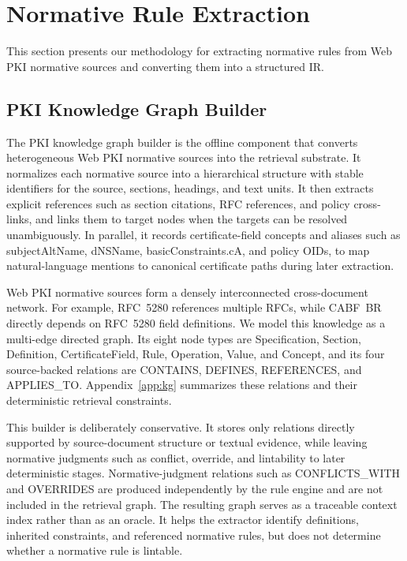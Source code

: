 \section{Normative Rule Extraction}
\label{sec:rule-extraction}

This section presents our methodology for extracting normative rules from Web
PKI normative sources and converting them into a structured IR.

\subsection{PKI Knowledge Graph Builder}
\label{sec:method-kg-builder}

The PKI knowledge graph builder is the offline component that converts heterogeneous Web PKI normative sources into the retrieval substrate.
It normalizes each normative source into a hierarchical structure with stable identifiers for the source, sections, headings, and text units.
It then extracts explicit references such as section citations, RFC references, and policy cross-links, and links them to target nodes when the targets can be resolved unambiguously.
In parallel, it records certificate-field concepts and aliases such as subjectAltName, dNSName, basicConstraints.cA, and policy OIDs, to map natural-language mentions to canonical certificate paths during later extraction.

Web PKI normative sources form a densely interconnected cross-document network.
For example, RFC~5280 references multiple RFCs, while CABF~BR directly depends on RFC~5280 field definitions.
We model this knowledge as a multi-edge directed graph. Its eight node types are Specification, Section, Definition, CertificateField, Rule, Operation, Value, and Concept, and its four source-backed relations are CONTAINS, DEFINES, REFERENCES, and APPLIES\_TO. Appendix~\ref{app:kg} summarizes these relations and their deterministic retrieval constraints.

This builder is deliberately conservative.
It stores only relations directly supported by source-document structure or textual evidence, while leaving normative judgments such as conflict, override, and lintability to later deterministic stages.
Normative-judgment relations such as CONFLICTS\_WITH and OVERRIDES are produced independently by the rule engine and are not included in the retrieval graph.
The resulting graph serves as a traceable context index rather than as an oracle. It helps the extractor identify definitions, inherited constraints, and referenced normative rules, but does not determine whether a normative rule is lintable.

